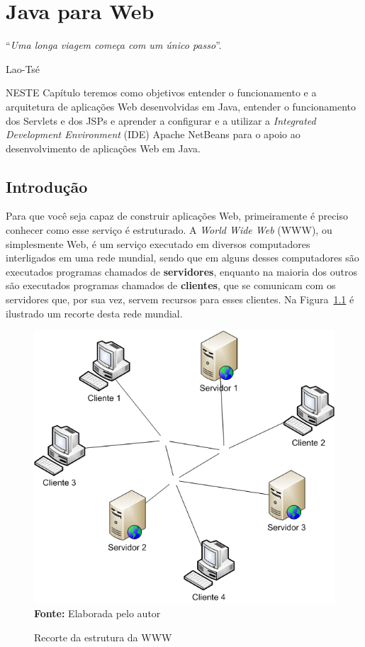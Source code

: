\chapter{Java para Web}\label{cap:javaParaWeb}
\epigraph{``\textit{Uma longa viagem começa com um único passo}''.}{Lao-Tsé}

\lettrine[lines=4, lhang=0.1, lraise=0, loversize=0.2, findent=0.1em]{\textcolor{corTema}{N}}{ESTE} Capítulo teremos como objetivos entender o funcionamento e a arquitetura de aplicações Web desenvolvidas em Java, entender o funcionamento dos Servlets e dos JSPs e aprender a configurar e a utilizar a \textit{Integrated Development Environment} (IDE) Apache NetBeans para o apoio ao desenvolvimento de aplicações Web em Java.


\section{Introdução}

Para que você seja capaz de construir aplicações Web, primeiramente é preciso conhecer como esse serviço é estruturado. A \textit{World Wide Web} (WWW), ou simplesmente Web, é um serviço executado em diversos computadores interligados em uma rede mundial, sendo que em alguns desses computadores são executados programas chamados de \textbf{servidores}, enquanto na maioria dos outros são executados programas chamados de \textbf{clientes}, que se comunicam com os servidores que, por sua vez, servem recursos para esses clientes. Na Figura~\ref{fig:cap01ClienteServidor} é ilustrado um recorte desta rede mundial.

\FloatBarrier
\begin{figure}[!htbp]
    \centering
    \caption{Recorte da estrutura da WWW}
    \includegraphics[scale=0.6]{imagens/cap01ClienteServidor}
    \\\textbf{Fonte:} Elaborada pelo autor
    \label{fig:cap01ClienteServidor}
\end{figure}
\FloatBarrier


